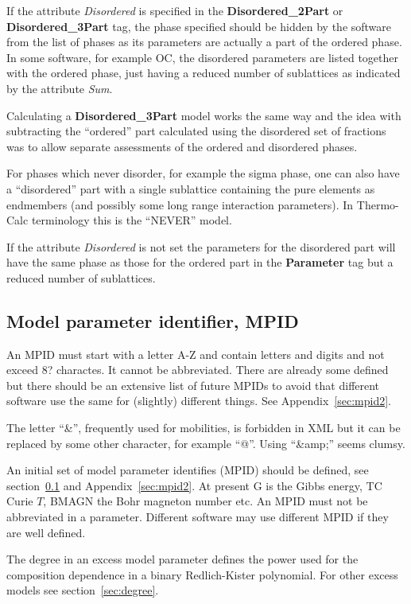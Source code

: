 \documentclass{article}
\begin{document}
If the attribute {\em Disordered} is specified in the {\bf
  Disordered\_2Part} or {\bf Disordered\_3Part} tag, the phase
specified should be hidden by the software from the list of phases as
its parameters are actually a part of the ordered phase.  In some
software, for example OC, the disordered parameters are listed
together with the ordered phase, just having a reduced number of
sublattices as indicated by the attribute {\em Sum}.

Calculating a {\bf Disordered\_3Part} model works the same way and the
idea with subtracting the ``ordered'' part calculated using the
disordered set of fractions was to allow separate assessments of the
ordered and disordered phases.

For phases which never disorder, for example the sigma phase, one can
also have a ``disordered'' part with a single sublattice containing
the pure elements as endmembers (and possibly some long range
interaction parameters).  In Thermo-Calc terminology this is the
``NEVER'' model.

If the attribute {\em Disordered} is not set the parameters for the
disordered part will have the same phase as those for the ordered part
in the {\bf Parameter} tag but a reduced number of sublattices.


\subsection{Model parameter identifier, MPID}\label{sec:mpid}

An MPID must start with a letter A-Z and contain letters and digits
and not exceed 8? charactes.  It cannot be abbreviated.  There are
already some defined but there should be an extensive list of future
MPIDs to avoid that different software use the same for (slightly)
different things.  See Appendix~\ref{sec:mpid2}.
  
The letter ``\&'', frequently used for mobilities, is forbidden in XML
but it can be replaced by some other character, for example ``@''.
Using ``\&amp;'' seems clumsy.

An initial set of model parameter identifies (MPID) should be defined,
see section~\ref{sec:mpid} and Appendix~\ref{sec:mpid2}.  At present G
is the Gibbs energy, TC Curie $T$, BMAGN the Bohr magneton number etc.
An MPID must not be abbreviated in a parameter.  Different software
may use different MPID if they are well defined.

The degree in an excess model parameter defines the power used for the
composition dependence in a binary Redlich-Kister polynomial.  For
other excess models see section~\ref{sec:degree}.
\end{document}
